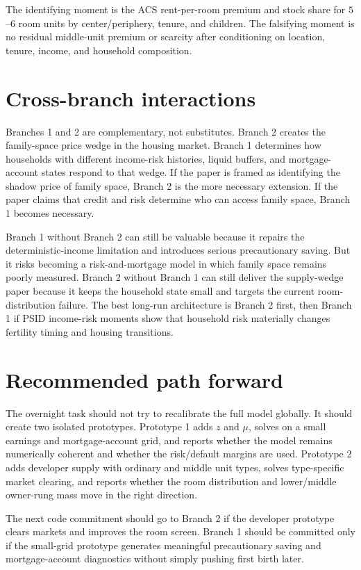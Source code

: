 \documentclass[11pt]{article}
\begin{document}
The identifying moment is the ACS rent-per-room premium and stock share for $5$--$6$ room units by center/periphery, tenure, and children. The falsifying moment is no residual middle-unit premium or scarcity after conditioning on location, tenure, income, and household composition.

\section{Cross-branch interactions}

Branches 1 and 2 are complementary, not substitutes. Branch 2 creates the family-space price wedge in the housing market. Branch 1 determines how households with different income-risk histories, liquid buffers, and mortgage-account states respond to that wedge. If the paper is framed as identifying the shadow price of family space, Branch 2 is the more necessary extension. If the paper claims that credit and risk determine who can access family space, Branch 1 becomes necessary.

Branch 1 without Branch 2 can still be valuable because it repairs the deterministic-income limitation and introduces serious precautionary saving. But it risks becoming a risk-and-mortgage model in which family space remains poorly measured. Branch 2 without Branch 1 can still deliver the supply-wedge paper because it keeps the household state small and targets the current room-distribution failure. The best long-run architecture is Branch 2 first, then Branch 1 if PSID income-risk moments show that household risk materially changes fertility timing and housing transitions.

\section{Recommended path forward}

The overnight task should not try to recalibrate the full model globally. It should create two isolated prototypes. Prototype 1 adds $z$ and $\mu$, solves on a small earnings and mortgage-account grid, and reports whether the model remains numerically coherent and whether the risk/default margins are used. Prototype 2 adds developer supply with ordinary and middle unit types, solves type-specific market clearing, and reports whether the room distribution and lower/middle owner-rung mass move in the right direction.

The next code commitment should go to Branch 2 if the developer prototype clears markets and improves the room screen. Branch 1 should be committed only if the small-grid prototype generates meaningful precautionary saving and mortgage-account diagnostics without simply pushing first birth later.
\end{document}
